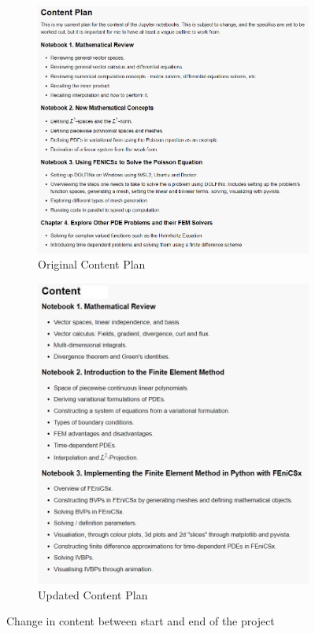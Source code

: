 \begin{figure}[H]
\centering
\begin{subfigure}{.5\textwidth}
  \centering
  \includegraphics[scale=0.4]{og_content_plan}
  \caption{Original Content Plan} \label{fig:og-content-plan}
\end{subfigure}%
\begin{subfigure}{.5\textwidth}
  \centering
  \includegraphics[scale=0.4]{new_content_plan}
  \caption{Updated Content Plan} \label{fig:new-content-plan}
\end{subfigure}
\caption{Change in content between start and end of the project}
\label{fig:test}
\end{figure}

